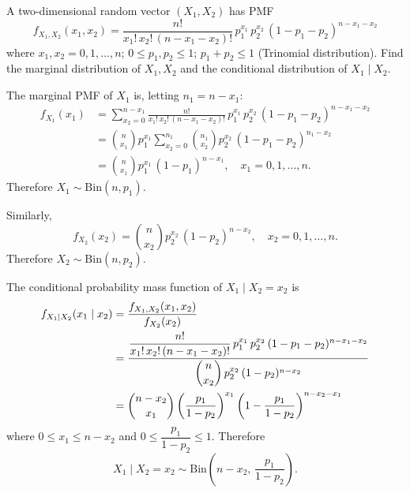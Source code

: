 \begin{example}
    A two-dimensional random vector $(X_1, X_2)$ has PMF
    \[
        f_{X_1, X_2}(x_1, x_2) = \frac{n!}{x_1!\, x_2!\, (n - x_1 - x_2)!}\, p_1^{x_1}\, p_2^{x_2}\, (1 - p_1 - p_2)^{n - x_1 - x_2}
    \]
    where $x_1, x_2 = 0, 1, \ldots, n$; $0 \leq p_1, p_2 \leq 1$; $p_1 + p_2 \leq 1$ (Trinomial distribution).
    Find the marginal distribution of $X_1, X_2$ and the conditional distribution of $X_1 \mid X_2$.
\end{example}
\begin{solution}
    The marginal PMF of $X_1$ is, letting $n_1 = n - x_1$:
    \begin{align*}
        f_{X_1}(x_1) &= \sum_{x_2=0}^{n - x_1} \frac{n!}{x_1!\, x_2!\, (n - x_1 - x_2)!}\, p_1^{x_1}\, p_2^{x_2}\, (1 - p_1 - p_2)^{n - x_1 - x_2}\\
        &= \binom{n}{x_1} p_1^{x_1} \sum_{x_2=0}^{n_1} \binom{n_1}{x_2} p_2^{x_2}\, (1 - p_1 - p_2)^{n_1 - x_2}\\
        &= \binom{n}{x_1} p_1^{x_1}\, (1 - p_1)^{n - x_1}, \quad x_1 = 0, 1, \ldots, n.
    \end{align*}
    Therefore $X_1 \sim \text{Bin}(n, p_1)$.

    Similarly,
    \[
        f_{X_2}(x_2) = \binom{n}{x_2} p_2^{x_2}\, (1 - p_2)^{n - x_2}, \quad x_2 = 0, 1, \ldots, n.
    \]
    Therefore $X_2 \sim \text{Bin}(n, p_2)$.

    The conditional probability mass function of $X_1 \mid X_2 = x_2$ is
    \begin{align*}
        f_{X_1 \mid X_2}(x_1 \mid x_2) &= \frac{f_{X_1, X_2}(x_1, x_2)}{f_{X_2}(x_2)}\\
        &= \frac{\dfrac{n!}{x_1!\, x_2!\, (n - x_1 - x_2)!}\, p_1^{x_1}\, p_2^{x_2}\, (1 - p_1 - p_2)^{n - x_1 - x_2}}{\dbinom{n}{x_2}\, p_2^{x_2}\, (1 - p_2)^{n - x_2}}\\
        &= \binom{n - x_2}{x_1} \left( \frac{p_1}{1 - p_2} \right)^{x_1} \left( 1 - \frac{p_1}{1 - p_2} \right)^{n - x_2 - x_1}
    \end{align*}
    where $0 \leq x_1 \leq n - x_2$ and $0 \leq \dfrac{p_1}{1 - p_2} \leq 1$.
    Therefore 
    \[
    X_1 \mid X_2 = x_2 \sim \text{Bin}\!\left(n - x_2,\, \dfrac{p_1}{1 - p_2}\right).
    \]
\end{solution}

